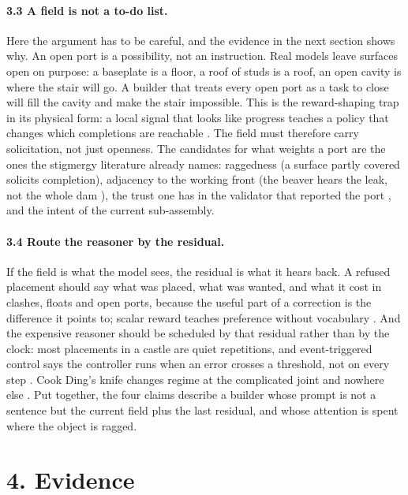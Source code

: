\documentclass[11pt,a4paper]{article}
\begin{document}
\paragraph{3.3 A field is not a to-do list.} Here the argument has to be careful, and the evidence in the next section shows why. An open port is a possibility, not an instruction. Real models leave surfaces open on purpose: a baseplate is a floor, a roof of studs is a roof, an open cavity is where the stair will go. A builder that treats every open port as a task to close will fill the cavity and make the stair impossible. This is the reward-shaping trap in its physical form: a local signal that looks like progress teaches a policy that changes which completions are reachable \cite{ng1999policy}. The field must therefore carry solicitation, not just openness. The candidates for what weights a port are the ones the stigmergy literature already names: raggedness (a surface partly covered solicits completion), adjacency to the working front (the beaver hears the leak, not the whole dam \cite{wilsson1962beaver}), the trust one has in the validator that reported the port \cite{friston2011active}, and the intent of the current sub-assembly.

\paragraph{3.4 Route the reasoner by the residual.} If the field is what the model sees, the residual is what it hears back. A refused placement should say what was placed, what was wanted, and what it cost in clashes, floats and open ports, because the useful part of a correction is the difference it points to; scalar reward teaches preference without vocabulary \cite{lightman2023verify,shinn2023reflexion}. And the expensive reasoner should be scheduled by that residual rather than by the clock: most placements in a castle are quiet repetitions, and event-triggered control says the controller runs when an error crosses a threshold, not on every step \cite{tabuada2007event}. Cook Ding's knife changes regime at the complicated joint and nowhere else \cite{zhuangziinner}. Put together, the four claims describe a builder whose prompt is not a sentence but the current field plus the last residual, and whose attention is spent where the object is ragged.

\section*{4. Evidence}
\end{document}
